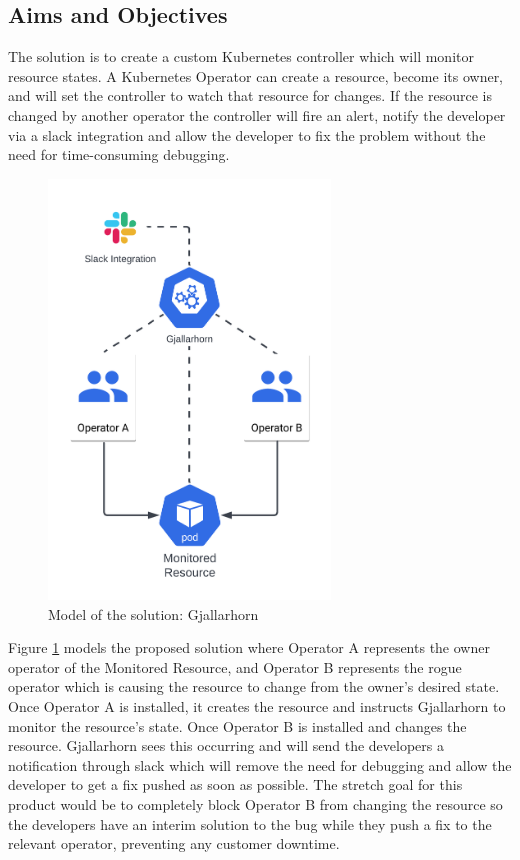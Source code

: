 \documentclass{article}
\begin{document}
\subsection{Aims and Objectives}
The solution is to create a custom Kubernetes controller which will monitor resource states. A Kubernetes Operator can create a resource, become its owner, and will set the controller to watch that resource for changes. If the resource is changed by another operator the controller will fire an alert, notify the developer via a slack integration and allow the developer to fix the problem without the need for time-consuming debugging. 




\begin{figure}[!hb]
    \centering
    \includegraphics[width=75mm]{solution-model.png}
    \caption{Model of the solution: Gjallarhorn}
    \label{solution-model}
\end{figure}

Figure \ref{solution-model} models the proposed solution where Operator A represents the owner operator of the Monitored Resource, and Operator B represents the rogue operator which is causing the resource to change from the owner’s desired state. Once Operator A is installed, it creates the resource and instructs Gjallarhorn to monitor the resource’s state. Once Operator B is installed and changes the resource. Gjallarhorn sees this occurring and will send the developers a notification through slack which will remove the need for debugging and allow the developer to get a fix pushed as soon as possible. The stretch goal for this product would be to completely block Operator B from changing the resource so the developers have an interim solution to the bug while they push a fix to the relevant operator, preventing any customer downtime.
\end{document}
